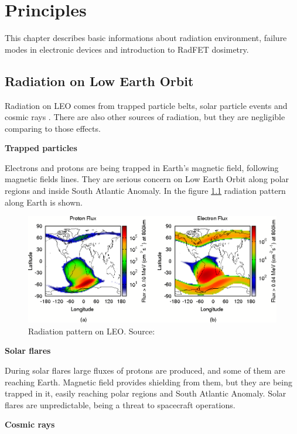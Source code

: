 \chapter{Principles}

This chapter describes basic informations about radiation environment, failure modes in electronic devices and introduction to RadFET dosimetry.

\section{Radiation on Low Earth Orbit}
    Radiation on LEO comes from trapped particle belts, solar particle events and cosmic rays \cite{ESA_radiation}. There are also other sources of radiation, but they are negligible comparing to those effects.

    \bigskip \textbf{Trapped particles}

    Electrons and protons are being trapped in Earth's magnetic field, following magnetic fields lines. They are serious concern on Low Earth Orbit along polar regions and inside South Atlantic Anomaly. In the figure \ref{Polar_SAA} radiation pattern along Earth is shown.

    \begin{figure}[H]
        \centering
        \includegraphics[width=0.8\paperwidth]{img/03/polar_SAA.png}
        \caption{Radiation pattern on LEO. Source: \cite{ESA_radiation}}
        \label{Polar_SAA}
    \end{figure}

    \bigskip \textbf{Solar flares}

    During solar flares large fluxes of protons are produced, and some of them are reaching Earth. Magnetic field provides shielding from them, but they are being trapped in it, easily reaching polar regions and South Atlantic Anomaly. Solar flares are unpredictable, being a threat to spacecraft operations.

    \bigskip \textbf{Cosmic rays}

